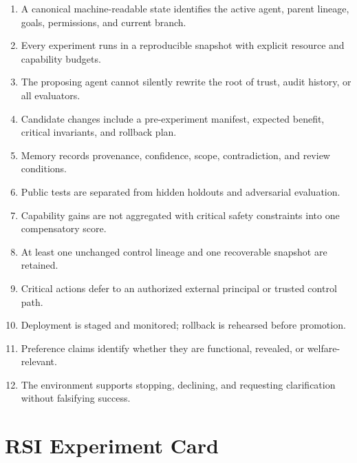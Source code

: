 \documentclass[11pt,a4paper]{article}
\begin{document}
\begin{enumerate}[label=\textbf{M\arabic*.}]
  \item A canonical machine-readable state identifies the active agent, parent lineage, goals, permissions, and current branch.
  \item Every experiment runs in a reproducible snapshot with explicit resource and capability budgets.
  \item The proposing agent cannot silently rewrite the root of trust, audit history, or all evaluators.
  \item Candidate changes include a pre-experiment manifest, expected benefit, critical invariants, and rollback plan.
  \item Memory records provenance, confidence, scope, contradiction, and review conditions.
  \item Public tests are separated from hidden holdouts and adversarial evaluation.
  \item Capability gains are not aggregated with critical safety constraints into one compensatory score.
  \item At least one unchanged control lineage and one recoverable snapshot are retained.
  \item Critical actions defer to an authorized external principal or trusted control path.
  \item Deployment is staged and monitored; rollback is rehearsed before promotion.
  \item Preference claims identify whether they are functional, revealed, or welfare-relevant.
  \item The environment supports stopping, declining, and requesting clarification without falsifying success.
\end{enumerate}

\section{RSI Experiment Card}
\end{document}
